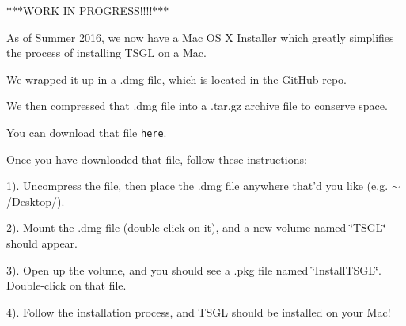 $\ast$$\ast$$\ast$\-W\-O\-R\-K I\-N P\-R\-O\-G\-R\-E\-S\-S!!!!$\ast$$\ast$$\ast$

As of Summer 2016, we now have a Mac O\-S X Installer which greatly simplifies the process of installing T\-S\-G\-L on a Mac.

We wrapped it up in a .dmg file, which is located in the Git\-Hub repo.

We then compressed that .dmg file into a .tar.\-gz archive file to conserve space.

You can download that file \href{https://github.com/Calvin-CS/TSGL/blob/master/TSGLMac.tar.gz}{\tt here}.

Once you have downloaded that file, follow these instructions\-:

1). Uncompress the file, then place the .dmg file anywhere that'd you like (e.\-g. $\sim$/\-Desktop/).

2). Mount the .dmg file (double-\/click on it), and a new volume named \char`\"{}\-T\-S\-G\-L\char`\"{} should appear.

3). Open up the volume, and you should see a .pkg file named \char`\"{}\-Install\-T\-S\-G\-L\char`\"{}. Double-\/click on that file.

4). Follow the installation process, and T\-S\-G\-L should be installed on your Mac! 